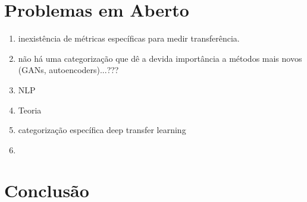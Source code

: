 \documentclass[sigconf]{acmart}
\begin{document}
\section{Problemas em Aberto}
\begin{enumerate}
  \item inexistência de métricas específicas para medir transferência.
  \item não há uma categorização que dê a devida importância a métodos mais novos (GANs, autoencoders)...???
  \item NLP
  \item Teoria
  \item categorização específica deep transfer learning
  \item 
\end{enumerate}
\lipsum[3]
\section{Conclusão}
\lipsum[3]


\end{document}
